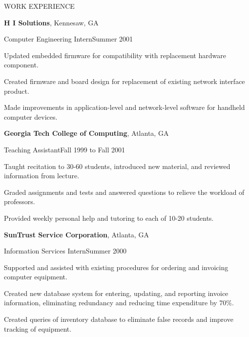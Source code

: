 \documentclass[letterpaper,10pt]{article}
\newenvironment{narrowitemize}{
    \begin{list}{\textbullet{}}{%
        \setlength{\topsep}{0pt}%
        \setlength{\itemsep}{0pt}%
        \setlength{\parsep}{0pt}%
    }
}{\end{list}}
\begin{document}
\bigskip

\noindent WORK EXPERIENCE

\textbf{H I Solutions}, Kennesaw, GA

Computer Engineering Intern\hfill{}Summer 2001

\begin{narrowitemize}

    \item Updated embedded firmware for compatibility with replacement
          hardware component.

    \item Created firmware and board design for replacement of
          existing network interface product.

    \item Made improvements in application-level and network-level
          software for handheld computer devices.

\end{narrowitemize}

\medskip

\textbf{Georgia Tech College of Computing}, Atlanta, GA

Teaching Assistant\hfill{}Fall 1999 to Fall 2001

\begin{narrowitemize}

    \item Taught recitation to 30-60 students, introduced new
          material, and reviewed information from lecture.

    \item Graded assignments and tests and answered questions to
          relieve the workload of professors.

    \item Provided weekly personal help and tutoring to each of 10-20
          students.

\end{narrowitemize}

\medskip

\textbf{SunTrust Service Corporation}, Atlanta, GA

Information Services Intern\hfill{}Summer 2000

\begin{narrowitemize}

    \item Supported and assisted with existing procedures for ordering
          and invoicing computer equipment.

    \item Created new database system for entering, updating, and
          reporting invoice information, eliminating redundancy and
          reducing time expenditure by 70\%.

    \item Created queries of inventory database to eliminate false
          records and improve tracking of equipment.

\end{narrowitemize}
\end{document}
